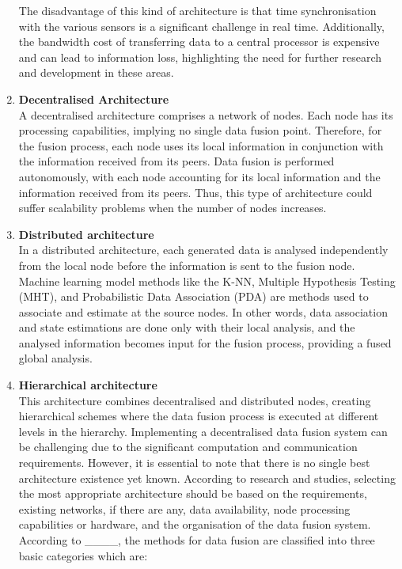 \begin{enumerate}
The disadvantage of this kind of architecture is that time synchronisation with the various sensors is a significant challenge in real time. Additionally, the bandwidth cost of transferring data to a central processor is expensive and can lead to information loss, highlighting the need for further research and development in these areas.
\item\textbf{Decentralised Architecture} \\A decentralised architecture comprises a network of nodes. Each node has its processing capabilities, implying no single data fusion point. Therefore, for the fusion process, each node uses its local information in conjunction with the information received from its peers. Data fusion is performed autonomously, with each node accounting for its local information and the information received from its peers. Thus, this type of architecture could suffer scalability problems when the number of nodes increases. 
\item\textbf{Distributed architecture} \\In a distributed architecture, each generated data is analysed independently from the local node before the information is sent to the fusion node. Machine learning model methods like the K-NN, Multiple Hypothesis Testing (MHT), and Probabilistic Data Association (PDA) are methods used to associate and estimate at the source nodes. In other words, data association and state estimations are done only with their local analysis, and the analysed information becomes input for the fusion process, providing a fused global analysis.
\item\textbf{Hierarchical architecture}
\\This architecture combines decentralised and distributed nodes, creating hierarchical schemes where the data fusion process is executed at different levels in the hierarchy. Implementing a decentralised data fusion system can be challenging due to the significant computation and communication requirements. However, it is essential to note that there is no single best architecture existence yet known.  
According to research and studies, selecting the most appropriate architecture should be based on the requirements, existing networks, if there are any, data availability, node processing capabilities or hardware, and the organisation of the data fusion system.  
According to ____, the methods for data fusion are classified into three basic categories which are:
\begin{itemize}  %

\end{itemize}
\end{enumerate}
